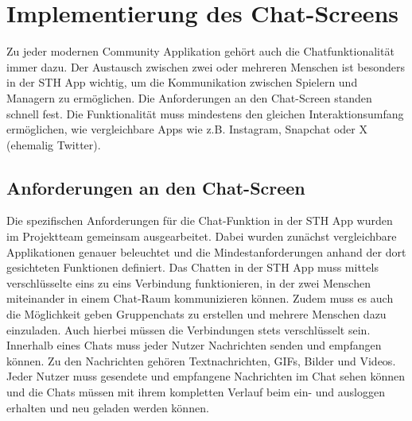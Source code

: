 \chapter{Implementierung des Chat-Screens}
Zu jeder modernen Community Applikation gehört auch die Chatfunktionalität immer dazu. Der Austausch zwischen zwei oder mehreren Menschen ist besonders in der STH App wichtig, um die Kommunikation zwischen Spielern und Managern zu ermöglichen. Die Anforderungen an den Chat-Screen standen schnell fest. Die Funktionalität muss mindestens den gleichen Interaktionsumfang ermöglichen, wie vergleichbare Apps wie z.B. Instagram, Snapchat oder X (ehemalig Twitter).

\section{Anforderungen an den Chat-Screen}
Die spezifischen Anforderungen für die Chat-Funktion in der STH App wurden im Projektteam gemeinsam ausgearbeitet. Dabei wurden zunächst vergleichbare Applikationen genauer beleuchtet und die Mindestanforderungen anhand der dort gesichteten Funktionen definiert. Das Chatten in der STH App muss mittels verschlüsselte eins zu eins Verbindung funktionieren, in der zwei Menschen miteinander in einem Chat-Raum kommunizieren können. Zudem muss es auch die Möglichkeit geben Gruppenchats zu erstellen und mehrere Menschen dazu einzuladen. Auch hierbei müssen die Verbindungen stets verschlüsselt sein. Innerhalb eines Chats muss jeder Nutzer Nachrichten senden und empfangen können. Zu den Nachrichten gehören Textnachrichten, GIFs, Bilder und Videos. Jeder Nutzer muss gesendete und empfangene Nachrichten im Chat sehen können und die Chats müssen mit ihrem kompletten Verlauf beim ein- und ausloggen erhalten und neu geladen werden können. 